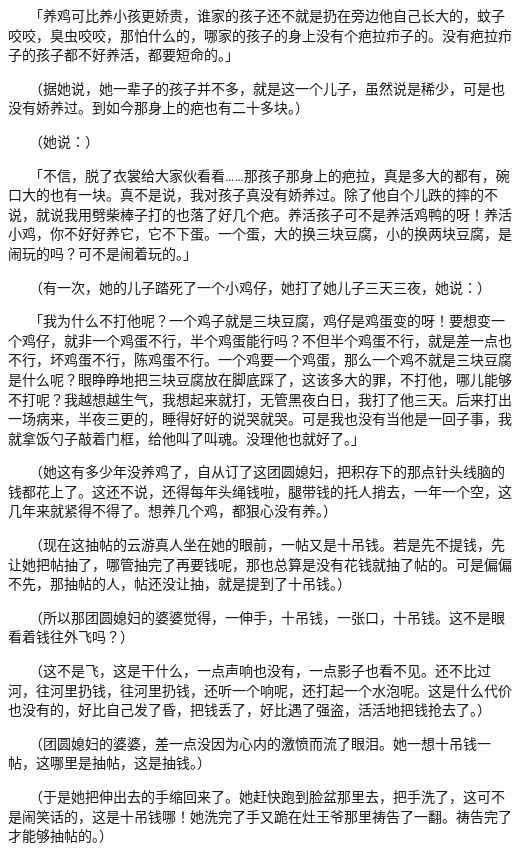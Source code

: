 \documentclass[UTF8]{ctexart}
\begin{document}
　　「养鸡可比养小孩更娇贵，谁家的孩子还不就是扔在旁边他自己长大的，蚊子咬咬，臭虫咬咬，那怕什么的，哪家的孩子的身上没有个疤拉疖子的。没有疤拉疖子的孩子都不好养活，都要短命的。」

　　（据她说，她一辈子的孩子并不多，就是这一个儿子，虽然说是稀少，可是也没有娇养过。到如今那身上的疤也有二十多块。）

　　（她说：）

　　「不信，脱了衣裳给大家伙看看……那孩子那身上的疤拉，真是多大的都有，碗口大的也有一块。真不是说，我对孩子真没有娇养过。除了他自个儿跌的摔的不说，就说我用劈柴棒子打的也落了好几个疤。养活孩子可不是养活鸡鸭的呀！养活小鸡，你不好好养它，它不下蛋。一个蛋，大的换三块豆腐，小的换两块豆腐，是闹玩的吗？可不是闹着玩的。」

　　（有一次，她的儿子踏死了一个小鸡仔，她打了她儿子三天三夜，她说：）

　　「我为什么不打他呢？一个鸡子就是三块豆腐，鸡仔是鸡蛋变的呀！要想变一个鸡仔，就非一个鸡蛋不行，半个鸡蛋能行吗？不但半个鸡蛋不行，就是差一点也不行，坏鸡蛋不行，陈鸡蛋不行。一个鸡要一个鸡蛋，那么一个鸡不就是三块豆腐是什么呢？眼睁睁地把三块豆腐放在脚底踩了，这该多大的罪，不打他，哪儿能够不打呢？我越想越生气，我想起来就打，无管黑夜白日，我打了他三天。后来打出一场病来，半夜三更的，睡得好好的说哭就哭。可是我也没有当他是一回子事，我就拿饭勺子敲着门框，给他叫了叫魂。没理他也就好了。」

　　（她这有多少年没养鸡了，自从订了这团圆媳妇，把积存下的那点针头线脑的钱都花上了。这还不说，还得每年头绳钱啦，腿带钱的托人捎去，一年一个空，这几年来就紧得不得了。想养几个鸡，都狠心没有养。）

　　（现在这抽帖的云游真人坐在她的眼前，一帖又是十吊钱。若是先不提钱，先让她把帖抽了，哪管抽完了再要钱呢，那也总算是没有花钱就抽了帖的。可是偏偏不先，那抽帖的人，帖还没让抽，就是提到了十吊钱。）

　　（所以那团圆媳妇的婆婆觉得，一伸手，十吊钱，一张口，十吊钱。这不是眼看着钱往外飞吗？）

　　（这不是飞，这是干什么，一点声响也没有，一点影子也看不见。还不比过河，往河里扔钱，往河里扔钱，还听一个响呢，还打起一个水泡呢。这是什么代价也没有的，好比自己发了昏，把钱丢了，好比遇了强盗，活活地把钱抢去了。）

　　（团圆媳妇的婆婆，差一点没因为心内的激愤而流了眼泪。她一想十吊钱一帖，这哪里是抽帖，这是抽钱。）

　　（于是她把伸出去的手缩回来了。她赶快跑到脸盆那里去，把手洗了，这可不是闹笑话的，这是十吊钱哪！她洗完了手又跪在灶王爷那里祷告了一翻。祷告完了才能够抽帖的。）
\end{document}
